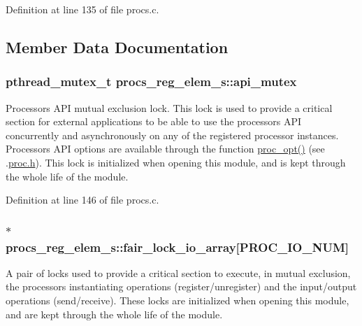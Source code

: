 Definition at line 135 of file procs.\+c.



\subsection{Member Data Documentation}
\subsubsection[{\texorpdfstring{api\+\_\+mutex}{api_mutex}}]{\setlength{\rightskip}{0pt plus 5cm}pthread\+\_\+mutex\+\_\+t procs\+\_\+reg\+\_\+elem\+\_\+s\+::api\+\_\+mutex}\hypertarget{structprocs__reg__elem__s_a9b7bb6d12868ba74184d95f1a2fdd2ab}{}\label{structprocs__reg__elem__s_a9b7bb6d12868ba74184d95f1a2fdd2ab}
Processor\textquotesingle{}s A\+PI mutual exclusion lock. This lock is used to provide a critical section for external applications to be able to use the processor\textquotesingle{}s A\+PI concurrently and asynchronously on any of the registered processor instances. Processor\textquotesingle{}s A\+PI options are available through the function \textquotesingle{}\hyperlink{proc_8c_a0367a65712bcd2e762ec1e9e3035cb3b}{proc\+\_\+opt()}\textquotesingle{} (see .\hyperlink{proc_8h}{proc.\+h}). This lock is initialized when opening this module, and is kept through the whole life of the module. 

Definition at line 146 of file procs.\+c.

\subsubsection[{\texorpdfstring{fair\+\_\+lock\+\_\+io\+\_\+array}{fair_lock_io_array}}]{$\ast$ procs\+\_\+reg\+\_\+elem\+\_\+s\+::fair\+\_\+lock\+\_\+io\+\_\+array\mbox{[}P\+R\+O\+C\+\_\+\+I\+O\+\_\+\+N\+UM\mbox{]}}\hypertarget{structprocs__reg__elem__s_a4de246450a9e79fe65ab600814311c6d}{}\label{structprocs__reg__elem__s_a4de246450a9e79fe65ab600814311c6d}
A pair of locks used to provide a critical section to execute, in mutual exclusion, the processor\textquotesingle{}s instantiating operations (register/unregister) and the input/output operations (send/receive). These locks are initialized when opening this module, and are kept through the whole life of the module. 

